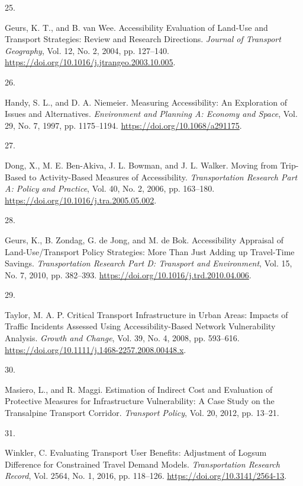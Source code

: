 \documentclass[
  letterpaper,
]{trb}
\newlength{\cslhangindent}
\newlength{\csllabelwidth}
\newlength{\cslentryspacingunit} %
\newenvironment{CSLReferences}[2] %
 {%
  \setlength{\parindent}{0pt}
  \ifodd #1
  \let\oldpar\par
  \def\par{\hangindent=\cslhangindent\oldpar}
  \fi
  \setlength{\parskip}{#2\cslentryspacingunit}
 }%
 {}
\newcommand{\CSLLeftMargin}[1]{\parbox[t]{\csllabelwidth}{#1}}
\newcommand{\CSLRightInline}[1]{\parbox[t]{\linewidth - \csllabelwidth}{#1}\break}
\begin{document}
\begin{CSLReferences}{0}{0}
\leavevmode{}%
\CSLLeftMargin{25. }%
\CSLRightInline{Geurs, K. T., and B. van Wee. Accessibility Evaluation
of Land-Use and Transport Strategies: Review and Research Directions.
\emph{Journal of Transport Geography}, Vol. 12, No. 2, 2004, pp.
127--140. \url{https://doi.org/10.1016/j.jtrangeo.2003.10.005}.}

\leavevmode{}%
\CSLLeftMargin{26. }%
\CSLRightInline{Handy, S. L., and D. A. Niemeier. Measuring
Accessibility: An Exploration of Issues and Alternatives.
\emph{Environment and Planning A: Economy and Space}, Vol. 29, No. 7,
1997, pp. 1175--1194. \url{https://doi.org/10.1068/a291175}.}

\leavevmode{}%
\CSLLeftMargin{27. }%
\CSLRightInline{Dong, X., M. E. Ben-Akiva, J. L. Bowman, and J. L.
Walker. Moving from Trip-Based to Activity-Based Measures of
Accessibility. \emph{Transportation Research Part A: Policy and
Practice}, Vol. 40, No. 2, 2006, pp. 163--180.
\url{https://doi.org/10.1016/j.tra.2005.05.002}.}

\leavevmode{}%
\CSLLeftMargin{28. }%
\CSLRightInline{Geurs, K., B. Zondag, G. de Jong, and M. de Bok.
Accessibility Appraisal of Land-Use/Transport Policy Strategies: More
Than Just Adding up Travel-Time Savings. \emph{Transportation Research
Part D: Transport and Environment}, Vol. 15, No. 7, 2010, pp. 382--393.
\url{https://doi.org/10.1016/j.trd.2010.04.006}.}

\leavevmode{}%
\CSLLeftMargin{29. }%
\CSLRightInline{Taylor, M. A. P. Critical Transport Infrastructure in
Urban Areas: Impacts of Traffic Incidents Assessed Using
Accessibility-Based Network Vulnerability Analysis. \emph{Growth and
Change}, Vol. 39, No. 4, 2008, pp. 593--616.
\url{https://doi.org/10.1111/j.1468-2257.2008.00448.x}.}

\leavevmode{}%
\CSLLeftMargin{30. }%
\CSLRightInline{Masiero, L., and R. Maggi. Estimation of Indirect Cost
and Evaluation of Protective Measures for Infrastructure Vulnerability:
A Case Study on the Transalpine Transport Corridor. \emph{Transport
Policy}, Vol. 20, 2012, pp. 13--21.}

\leavevmode{}%
\CSLLeftMargin{31. }%
\CSLRightInline{Winkler, C. Evaluating Transport User Benefits:
Adjustment of Logsum Difference for Constrained Travel Demand Models.
\emph{Transportation Research Record}, Vol. 2564, No. 1, 2016, pp.
118--126. \url{https://doi.org/10.3141/2564-13}.}


\end{CSLReferences}
\end{document}
